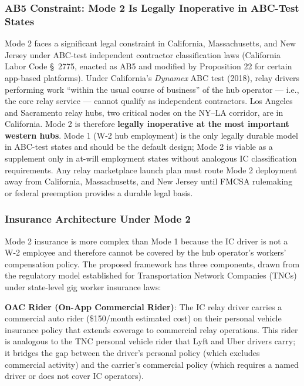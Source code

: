 \subsubsection*{AB5 Constraint: Mode 2 Is Legally Inoperative in ABC-Test States}

Mode 2 faces a significant legal constraint in California, Massachusetts, and New Jersey under ABC-test independent contractor classification laws (California Labor Code \S~2775, enacted as AB5 and modified by Proposition 22 for certain app-based platforms). Under California's \textit{Dynamex} ABC test (2018), relay drivers performing work ``within the usual course of business'' of the hub operator --- i.e., the core relay service --- cannot qualify as independent contractors. Los Angeles and Sacramento relay hubs, two critical nodes on the NY--LA corridor, are in California. Mode 2 is therefore \textbf{legally inoperative at the most important western hubs}. Mode 1 (W-2 hub employment) is the only legally durable model in ABC-test states and should be the default design; Mode 2 is viable as a supplement only in at-will employment states without analogous IC classification requirements. Any relay marketplace launch plan must route Mode 2 deployment away from California, Massachusetts, and New Jersey until FMCSA rulemaking or federal preemption provides a durable legal basis.

\subsubsection*{Insurance Architecture Under Mode 2}

Mode 2 insurance is more complex than Mode 1 because the IC driver is not a W-2 employee and therefore cannot be covered by the hub operator's workers' compensation policy. The proposed framework has three components, drawn from the regulatory model established for Transportation Network Companies (TNCs) under state-level gig worker insurance laws:

\textbf{OAC Rider (On-App Commercial Rider)}: The IC relay driver carries a commercial auto rider (\$150/month estimated cost) on their personal vehicle insurance policy that extends coverage to commercial relay operations. This rider is analogous to the TNC personal vehicle rider that Lyft and Uber drivers carry; it bridges the gap between the driver's personal policy (which excludes commercial activity) and the carrier's commercial policy (which requires a named driver or does not cover IC operators).

